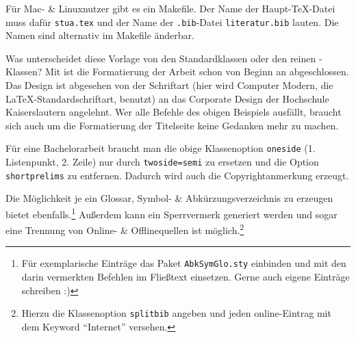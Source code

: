 Für Mac- \& Linuxnutzer gibt es ein Makefile. Der Name
der Haupt-\TeX-Datei muss dafür \verb!stua.tex! und der Name der
\verb!.bib!-Datei \verb!literatur.bib! lauten. Die Namen sind alternativ im
Makefile änderbar.

Was unterscheidet diese Vorlage von den Standardklassen oder den reinen
-Klassen? Mit \HSKLbook ist die Formatierung der
Arbeit schon von Beginn an abgeschlossen. Das Design ist abgesehen von der
Schriftart (hier wird Computer Modern, die \LaTeX-Standardschriftart, benutzt)
an das Corporate Design der Hochschule Kaiserslautern angelehnt. Wer alle
Befehle des obigen Beispiels ausfällt, braucht sich auch um die Formatierung der
Titelseite keine Gedanken mehr zu machen.

Für eine Bachelorarbeit braucht man die obige Klassenoption \verb!oneside!
(1. Listenpunkt, 2. Zeile) nur durch \verb!twoside=semi! zu ersetzen und die
Option \verb!shortprelims! zu entfernen. Dadurch wird auch die
Copyrightanmerkung erzeugt.

Die Möglichkeit je ein Glossar, Symbol- \&
Abkürzungsverzeichnis zu erzeugen bietet \HSKLbook ebenfalls.\footnote{Für
exemplarische Einträge das Paket \texttt{AbkSymGlo.sty} einbinden und mit den
darin vermerkten Befehlen im Fließtext einsetzen. Gerne auch eigene Einträge
schreiben :)} Außerdem kann ein Sperrvermerk generiert werden und sogar eine
Trennung von Online- \& Offlinequellen ist möglich.\footnote{Hierzu die
Klassenoption \texttt{splitbib} angeben und jeden online-Eintrag mit dem Keyword
\enquote{Internet} versehen.}
